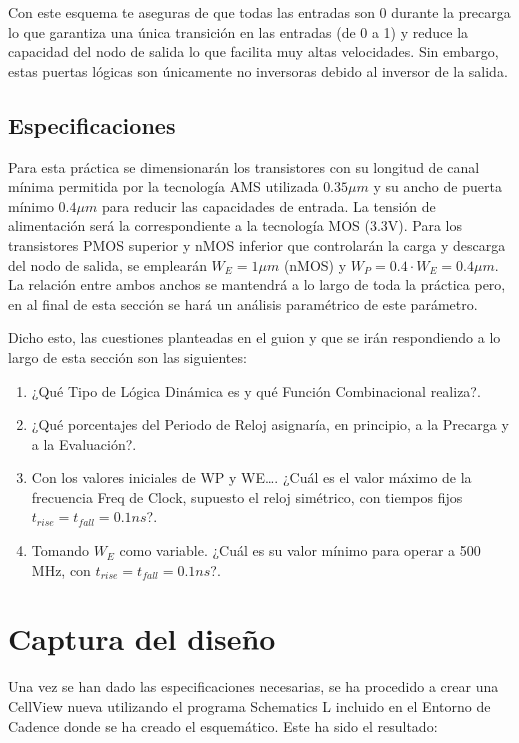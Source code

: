 Con este esquema te aseguras de que todas las entradas son 0 durante la precarga lo que garantiza una única transición en las entradas (de 0 a 1) y reduce la capacidad del nodo de salida lo que facilita muy altas velocidades. \cite{TheoryAdvant}
\newline Sin embargo, estas puertas lógicas son únicamente no inversoras debido al inversor de la salida.
\subsection{Especificaciones}
Para esta práctica se dimensionarán los transistores con su longitud de canal mínima permitida por la tecnología AMS utilizada $0.35\mu m$ y su ancho de puerta mínimo $0.4\mu m$ para reducir las capacidades de entrada. La tensión de alimentación será la correspondiente a la tecnología MOS (3.3V).
\newline Para los transistores PMOS superior y nMOS inferior que controlarán la carga y descarga del nodo de salida, se emplearán $W_E = 1\mu m$ (nMOS) y $W_P =0.4\cdot W_E = 0.4\mu m$. La relación entre ambos anchos se mantendrá a lo largo de toda la práctica pero, en al final de esta sección se hará un análisis paramétrico de este parámetro. \newpage
\par Dicho esto, las cuestiones planteadas en el guion y que se irán respondiendo a lo largo de esta sección son las siguientes:
\begin{enumerate}
    \item ¿Qué Tipo de Lógica Dinámica es y qué Función Combinacional realiza?.
    \item ¿Qué porcentajes del Periodo de Reloj asignaría, en principio, a la Precarga y a la Evaluación?.
    \item Con los valores iniciales de WP y WE…. ¿Cuál es el valor máximo de la frecuencia Freq de Clock, supuesto el reloj simétrico, con tiempos fijos $t_{rise} = t_{fall} = 0.1 ns$?.
    \item Tomando $W_E$ como variable. ¿Cuál es su valor mínimo para operar a 500 MHz, con $t_{rise} = t_{fall} = 0.1 ns$?.
\end{enumerate}

\section{Captura del diseño}
Una vez se han dado las especificaciones necesarias, se ha procedido a crear una CellView nueva utilizando el programa Schematics L incluido en el Entorno de Cadence donde se ha creado el esquemático. Este ha sido el resultado:

